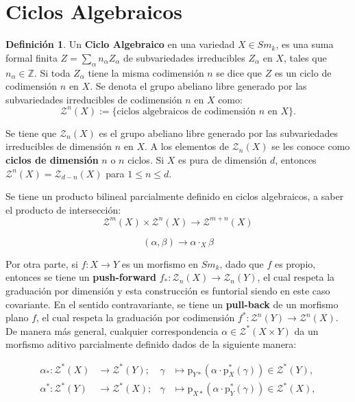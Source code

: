 \documentclass[10pt]{amsart}
\theoremstyle{definition}
\newtheorem{definition}{Definici\'on}[section]
\theoremstyle{remark}
\theoremstyle{definition}
\begin{document}
\newpage
\section{Ciclos Algebraicos}
\begin{definition} Un \textbf{Ciclo Algebraico} en una variedad $X \in Sm_{\mathit{k}}$, es una suma formal finita $Z=\sum_{\alpha}n_{\alpha}Z_{\alpha}$ de subvariedades irreducibles $Z_{\alpha}$ en $X$, tales que $n_{\alpha} \in \mathbb{Z}$. Si toda $Z_{\alpha}$ tiene la misma codimensión $n$ se dice que $Z$ es un ciclo de codimensión $n$ en $X$. Se denota el grupo abeliano libre generado por las subvariedades irreducibles de codimensión $n$ en $X$ como:
\[
\mathcal{Z}^n(X) := \{\text{ciclos algebraicos de codimensión } n \text{ en } X\}.
\]
\end{definition}

Se tiene que $\mathcal{Z}_{n}(X)$ es el grupo abeliano libre generado por las subvariedades irreducibles de dimensión $n$ en $X$. A los elementos de $\mathcal{Z}_{n}(X)$ se les conoce como \textbf{ciclos de dimensión} $n$ o $n$ ciclos.  Si $X$ es pura de dimensión $d$, entonces $\mathcal{Z}^{n}(X)=\mathcal{Z}_{d-n}(X)$ para $1 \leq n \leq d$.

Se tiene un producto bilineal parcialmente definido en ciclos algebraicos, a saber el producto de intersección:
\begin{equation*}
\mathcal{Z}^{m}(X) \times \mathcal{Z}^{n}(X) \rightarrow \mathcal{Z}^{m+n}(X)
\end{equation*}

\begin{equation*}
(\alpha,\beta) \rightarrow \alpha \cdot_{X} \beta
\end{equation*}

Por otra parte, si $f:X \rightarrow Y$ es un morfismo en $Sm_{\mathit{k}}$, dado que $f$ es propio, entonces se tiene un \textbf{push-forward} $f_{*}:\mathcal{Z}_{n}(X) \rightarrow \mathcal{Z}_{n}(Y)$, el cual respeta la graduación por dimensión y esta construcción es funtorial siendo en este caso covariante. En el sentido contravariante, se tiene un \textbf{pull-back} de un morfismo plano $f$, el cual respeta la graduación por codimensión $f^{*}:\mathcal{Z}^{n}(Y) \rightarrow \mathcal{Z}^{n}(X)$. De manera más general, cualquier correspondencia $\alpha \in \mathcal{Z}^{*}(X \times Y)$ da un morfismo aditivo parcialmente definido dados de la siguiente manera:

\[
\begin{aligned}
\alpha_*:\mathcal{Z}^*(X) &\to \mathcal{Z}^*(Y); &\gamma &\mapsto \mathrm{p}_{Y*}(\alpha \cdot \mathrm{p}_X^*(\gamma)) \in \mathcal{Z}^*(Y), \\
\alpha^*:\mathcal{Z}^*(Y) &\to \mathcal{Z}^*(X); &\gamma &\mapsto \mathrm{p}_{X*}(\alpha \cdot \mathrm{p}_Y^*(\gamma)) \in \mathcal{Z}^*(X),
\end{aligned}
\]
\end{document}
